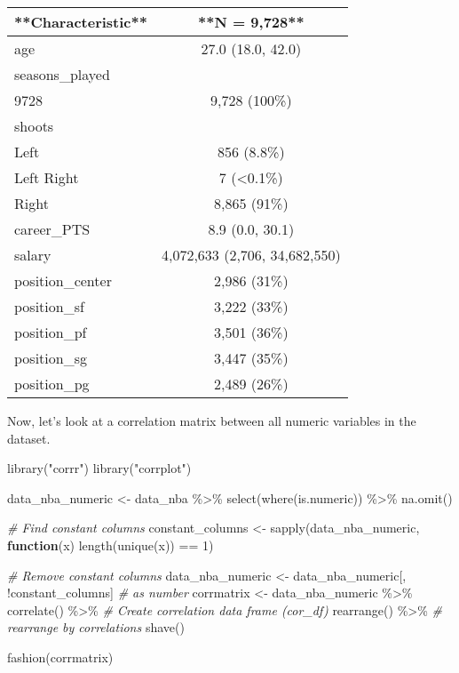\documentclass[
]{book}
\newenvironment{Shaded}{\begin{snugshade}}{\end{snugshade}}
\newcommand{\CommentTok}[1]{\textcolor[rgb]{0.56,0.35,0.01}{\textit{#1}}}
\newcommand{\ControlFlowTok}[1]{\textcolor[rgb]{0.13,0.29,0.53}{\textbf{#1}}}
\newcommand{\DecValTok}[1]{\textcolor[rgb]{0.00,0.00,0.81}{#1}}
\newcommand{\FunctionTok}[1]{\textcolor[rgb]{0.00,0.00,0.00}{#1}}
\newcommand{\FunctionTok}[1]{\textcolor[rgb]{0.13,0.29,0.53}{\textbf{#1}}}
\newcommand{\NormalTok}[1]{#1}
\newcommand{\OtherTok}[1]{\textcolor[rgb]{0.56,0.35,0.01}{#1}}
\newcommand{\SpecialCharTok}[1]{\textcolor[rgb]{0.00,0.00,0.00}{#1}}
\newcommand{\SpecialCharTok}[1]{\textcolor[rgb]{0.81,0.36,0.00}{\textbf{#1}}}
\newcommand{\StringTok}[1]{\textcolor[rgb]{0.31,0.60,0.02}{#1}}
\begin{document}
\begin{tabular}{l|c}
\hline
**Characteristic** & **N = 9,728**\\
\hline
age & 27.0 (18.0, 42.0)\\
\hline
seasons\_played & \\
\hline
9728 & 9,728 (100\%)\\
\hline
shoots & \\
\hline
Left & 856 (8.8\%)\\
\hline
Left Right & 7 (<0.1\%)\\
\hline
Right & 8,865 (91\%)\\
\hline
career\_PTS & 8.9 (0.0, 30.1)\\
\hline
salary & 4,072,633 (2,706, 34,682,550)\\
\hline
position\_center & 2,986 (31\%)\\
\hline
position\_sf & 3,222 (33\%)\\
\hline
position\_pf & 3,501 (36\%)\\
\hline
position\_sg & 3,447 (35\%)\\
\hline
position\_pg & 2,489 (26\%)\\
\hline
\end{tabular}

Now, let's look at a correlation matrix between all numeric
variables in the dataset.

\begin{Shaded}
\begin{Highlighting}[]
\FunctionTok{library}\NormalTok{(}\StringTok{"corrr"}\NormalTok{)}
\FunctionTok{library}\NormalTok{(}\StringTok{"corrplot"}\NormalTok{)}

\NormalTok{data\_nba\_numeric }\OtherTok{\textless{}{-}}\NormalTok{ data\_nba }\SpecialCharTok{\%\textgreater{}\%}
  \FunctionTok{select}\NormalTok{(}\FunctionTok{where}\NormalTok{(is.numeric)) }\SpecialCharTok{\%\textgreater{}\%}
  \FunctionTok{na.omit}\NormalTok{()}

\CommentTok{\# Find constant columns}
\NormalTok{constant\_columns }\OtherTok{\textless{}{-}} \FunctionTok{sapply}\NormalTok{(data\_nba\_numeric, }\ControlFlowTok{function}\NormalTok{(x) }\FunctionTok{length}\NormalTok{(}\FunctionTok{unique}\NormalTok{(x)) }\SpecialCharTok{==} \DecValTok{1}\NormalTok{)}

\CommentTok{\# Remove constant columns}
\NormalTok{data\_nba\_numeric }\OtherTok{\textless{}{-}}\NormalTok{ data\_nba\_numeric[, }\SpecialCharTok{!}\NormalTok{constant\_columns]}
\CommentTok{\# as number}
\NormalTok{corrmatrix }\OtherTok{\textless{}{-}}\NormalTok{ data\_nba\_numeric }\SpecialCharTok{\%\textgreater{}\%}
  \FunctionTok{correlate}\NormalTok{() }\SpecialCharTok{\%\textgreater{}\%}    \CommentTok{\# Create correlation data frame (cor\_df)}
  \FunctionTok{rearrange}\NormalTok{() }\SpecialCharTok{\%\textgreater{}\%}  \CommentTok{\# rearrange by correlations}
  \FunctionTok{shave}\NormalTok{() }

\FunctionTok{fashion}\NormalTok{(corrmatrix)}
\end{Highlighting}
\end{Shaded}
\end{document}
